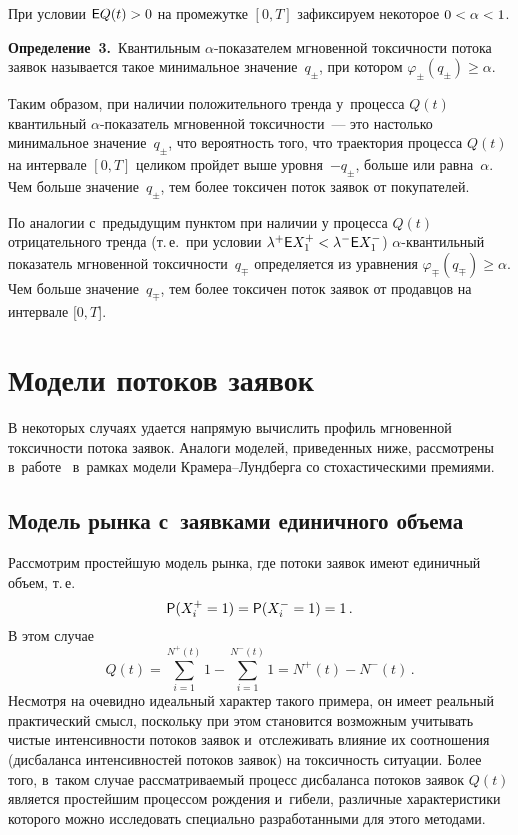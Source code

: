 \begin{multicols}{2}
При условии ${\sf E} Q(t) > 0$ на промежутке $[0, T]$ зафиксируем
некоторое $0 \hm< \alpha\hm < 1$.

\smallskip

\noindent
\textbf{Определение~3.}\
Квантильным {$\alpha$-по\-ка\-за\-те\-лем мгновенной токсичности} потока заявок
называется такое минимальное значение~$q_{\pm}$, при котором
$\varphi_{\pm}(q_{\pm}) \geqslant \alpha$.


Таким образом, при наличии положительного тренда у~процесса $Q(t)$
квантильный $\alpha$-по\-ка\-за\-тель мгновенной токсичности~---
это настолько минимальное значение~$q_{\pm}$, что вероятность того,
что траектория
процесса $Q(t)$ на интервале $[0, T]$ целиком пройдет выше уровня~$-q_{\pm}$,
больше или равна~$\alpha$. Чем больше значение~$q_{\pm}$, тем более
токсичен поток заявок от покупателей.

По аналогии с~предыдущим пунктом при наличии у процесса $Q(t)$
отрицательного тренда (т.\,е.\ при условии $\lambda^+ \Esf X_1^+ \hm<
\lambda^- \Esf X_1^-$) $\alpha$-кван\-тиль\-ный показатель мгновенной
токсичности~$q_{\mp}$ определяется из уравнения
$\varphi_{\mp}(q_{\mp}) \geqslant \alpha.$
Чем больше значение~$q_{\mp}$, тем более токсичен поток заявок от
продавцов на интервале $[0, T$].

\section{Модели потоков заявок}

В некоторых случаях удается напрямую вы\-чис\-лить профиль мгновенной
токсичности потока \mbox{заявок}. Аналоги моделей, приведенных ниже,
рассмотрены в~работе~\cite{Boykov2002} в~рамках модели
Кра\-ме\-ра--Лунд\-бер\-га со стохастическими премиями.

\subsection{Модель рынка с~заявками единичного объема}

Рассмотрим простейшую модель рынка, где потоки заявок имеют
единичный объем, т.\,е.\
$$
{\sf P} (X_i^+ = 1) = {\sf P} (X_i^- = 1) = 1\,.
$$
В этом случае
$$
Q(t) = \sum\limits_{i=1}^{N^+(t)} 1 - \sum\limits_{i=1}^{N^-(t)} 1 = N^+(t) - N^-(t)\,.
$$
Несмотря на очевидно идеальный характер такого примера, он имеет
реальный практический смысл, поскольку при этом становится возможным
учитывать чистые интенсивности потоков заявок и~отслеживать влияние
их соотношения (дисбаланса интенсивностей потоков заявок) на
токсичность ситуации. Более того, в~таком случае рассматриваемый
процесс дисбаланса потоков заявок $Q(t)$ является простейшим
процессом рождения и~гибели, различные характеристики которого можно
исследовать специально разработанными для этого методами.


\end{multicols}
